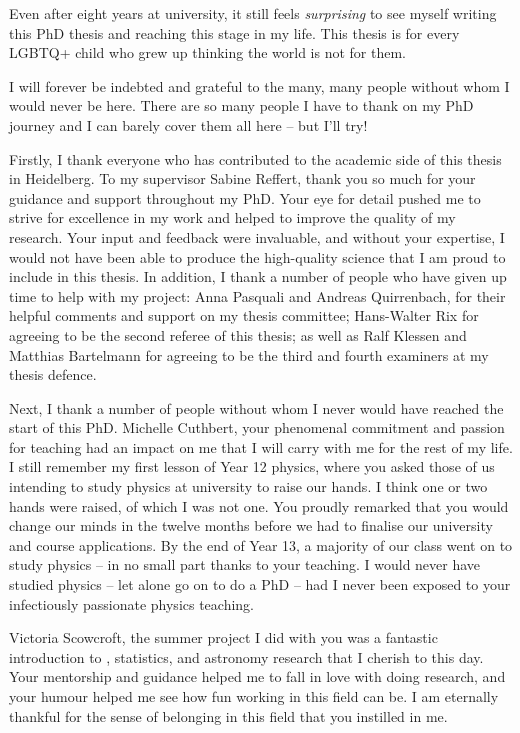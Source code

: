 %
\label{sec:acknowledgements}

Even after eight years at university, it still feels \emph{surprising} to see myself writing this PhD thesis and reaching this stage in my life. This thesis is for every LGBTQ+ child who grew up thinking the world is not for them.

I will forever be indebted and grateful to the many, many people without whom I would never be here. There are so many people I have to thank on my PhD journey and I can barely cover them all here -- but I'll try!

Firstly, I thank everyone who has contributed to the academic side of this thesis in Heidelberg. To my supervisor Sabine Reffert, thank you so much for your guidance and support throughout my PhD. Your eye for detail pushed me to strive for excellence in my work and helped to improve the quality of my research. Your input and feedback were invaluable, and without your expertise, I would not have been able to produce the high-quality science that I am proud to include in this thesis. In addition, I thank a number of people who have given up time to help with my project: Anna Pasquali and Andreas Quirrenbach, for their helpful comments and support on my thesis committee; Hans-Walter Rix for agreeing to be the second referee of this thesis; as well as Ralf Klessen and Matthias Bartelmann for agreeing to be the third and fourth examiners at my thesis defence. 

Next, I thank a number of people without whom I never would have reached the start of this PhD. Michelle Cuthbert, your phenomenal commitment and passion for teaching had an impact on me that I will carry with me for the rest of my life. I still remember my first lesson of Year 12 physics, where you asked those of us intending to study physics at university to raise our hands. I think one or two hands were raised, of which I was not one. You proudly remarked that you would change our minds in the twelve months before we had to finalise our university and course applications. By the end of Year 13, a majority of our class went on to study physics -- in no small part thanks to your teaching. I would never have studied physics -- let alone go on to do a PhD -- had I never been exposed to your infectiously passionate physics teaching.

Victoria Scowcroft, the summer project I did with you was a fantastic introduction to \gaia, statistics, and astronomy research that I cherish to this day. Your mentorship and guidance helped me to fall in love with doing research, and your humour helped me see how fun working in this field can be. I am eternally thankful for the sense of belonging in this field that you instilled in me.

